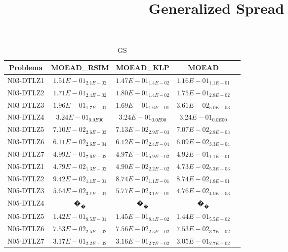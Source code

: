 \documentclass{article}
\title{Generalized Spread}
\author{}
\begin{document}
\maketitle
\begin{table*}[ht!]
\scriptsize
\caption{GS}
\centering\begin{tabular}{|c||c||c||c||c|} \hline
Problema &MOEAD_RSIM &MOEAD_KLP &MOEAD\\\hline
N03-DTLZ1 &$1.51E-01_{2.1E-02}$ &\cellcolor{gray25}$1.47E-01_{1.4E-02}$ &\cellcolor{gray95}$1.16E-01_{1.1E-01}$\\ 
\hline
N03-DTLZ2 &\cellcolor{gray95}$1.71E-01_{2.4E-02}$ &$1.80E-01_{1.4E-02}$ &\cellcolor{gray25}$1.75E-01_{2.8E-02}$\\ 
\hline
N03-DTLZ3 &$1.96E-01_{1.7E-01}$ &\cellcolor{gray25}$1.69E-01_{1.6E-01}$ &\cellcolor{gray95}$3.61E-02_{5.0E-03}$\\ 
\hline
N03-DTLZ4 &\cellcolor{gray95}$3.24E-01_{0.0E00}$ &\cellcolor{gray25}$3.24E-01_{0.0E00}$ &$3.24E-01_{0.0E00}$\\ 
\hline
N03-DTLZ5 &\cellcolor{gray25}$7.10E-02_{2.6E-03}$ &$7.13E-02_{2.9E-03}$ &\cellcolor{gray95}$7.07E-02_{2.8E-03}$\\ 
\hline
N03-DTLZ6 &\cellcolor{gray25}$6.11E-02_{2.6E-04}$ &$6.12E-02_{2.4E-04}$ &\cellcolor{gray95}$6.09E-02_{3.3E-04}$\\ 
\hline
N03-DTLZ7 &$4.99E-01_{7.6E-02}$ &\cellcolor{gray25}$4.97E-01_{5.9E-02}$ &\cellcolor{gray95}$4.92E-01_{1.1E-01}$\\ 
\hline
N05-DTLZ1 &\cellcolor{gray25}$4.79E-02_{1.3E-02}$ &$4.90E-02_{2.2E-02}$ &\cellcolor{gray95}$4.73E-02_{5.3E-03}$\\ 
\hline
N05-DTLZ2 &$9.42E-02_{1.1E-01}$ &\cellcolor{gray25}$8.74E-02_{1.1E-01}$ &\cellcolor{gray95}$8.74E-02_{1.8E-01}$\\ 
\hline
N05-DTLZ3 &\cellcolor{gray25}$5.64E-02_{3.1E-01}$ &$5.77E-02_{3.1E-01}$ &\cellcolor{gray95}$4.76E-02_{4.0E-03}$\\ 
\hline
N05-DTLZ4 &\cellcolor{gray25}$�_{�}$ &$�_{�}$ &$�_{�}$\\ 
\hline
N05-DTLZ5 &\cellcolor{gray95}$1.42E-01_{8.5E-01}$ &$1.45E-01_{8.4E-02}$ &\cellcolor{gray25}$1.44E-01_{5.5E-02}$\\ 
\hline
N05-DTLZ6 &\cellcolor{gray25}$7.53E-02_{2.5E-02}$ &$7.56E-02_{2.5E-02}$ &\cellcolor{gray95}$7.53E-02_{3.7E-02}$\\ 
\hline
N05-DTLZ7 &$3.17E-01_{2.2E-02}$ &\cellcolor{gray25}$3.16E-01_{2.7E-02}$ &\cellcolor{gray95}$3.05E-01_{2.7E-02}$\\ 

\end{tabular}
\end{table*}
\end{document}
